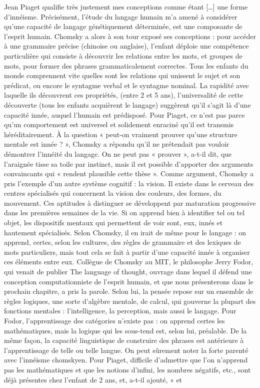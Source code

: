 Jean Piaget qualifie très justement mes conceptions comme étant […] une forme d'innéisme.
Précisément, l'étude du langage humain m'a amené à considérer qu'une capacité de langage
génétiquement déterminée, est une composante de l'esprit humain.
Chomsky a alors à son tour exposé ses conceptions : pour accéder à une grammaire précise (chinoise
ou anglaise), l'enfant déploie une compétence particulière qui consiste à découvrir les relations
entre les mots, et groupes de mots, pour former des phrases grammaticalement correctes. Tous les
enfants du monde comprennent vite quelles sont les relations qui unissent le sujet et son prédicat,
ou encore le syntagme verbal et le syntagme nominal. La rapidité avec laquelle ils découvrent
ces propriétés, (entre 2 et 5 ans), l’universalité de cette découverte (tous les enfants acquièrent le
langage) suggèrent qu'il s’agit là d’une capacité innée, auquel l'humain est prédisposé.
Pour Piaget, ce n’est pas parce qu'un comportement est universel et solidement enraciné qu'il
est transmis héréditairement. À la question « peut-on vraiment prouver qu’une structure mentale
est innée ? », Chomsky a répondu qu’il ne prétendait pas vouloir démontrer l'innéité du langage.
On ne peut pas « prouver », a-t-il dit, que l’araignée tisse sa toile par instinct, mais il est possible
d'apporter des arguments convaincants qui « rendent plausible cette thèse ». Comme argument,
Chomsky a pris l'exemple d’un autre système cognitif : la vision. Il existe dans le cerveau des
centres spécialisés qui concernent la vision des couleurs, des formes, du mouvement. Ces aptitudes
à distinguer se développent par maturation progressive dans les premières semaines de la vie. Si on
apprend bien à identifier tel ou tel objet, les dispositifs mentaux qui permettent de voir sont, eux,
innés et hautement spécialisés. Selon Chomsky, il en irait de même pour le langage : on apprend,
certes, selon les cultures, des règles de grammaire et des lexiques de mots particuliers, mais tout
cela se fait à partir d’une capacité innée à organiser ces éléments entre eux.
Collègue de Chomsky au MIT, le philosophe Jerry Fodor, qui venait de publier The language
of thought, ouvrage dans lequel il défend une conception computationniste de l'esprit humain, et
que nous présenterons dans le prochain chapitre, a pris la parole. Selon lui, la pensée repose sur un
ensemble de règles logiques, une sorte d'algèbre mentale, de calcul, qui gouverne la plupart des
fonctions mentales : l'intelligence, la perception, mais aussi le langage. Pour Fodor, l'apprentissage
des catégories n'existe pas : on apprend certes les mathématiques, mais la logique qui les sous-tend
est, selon lui, préalable. De la même façon, la capacité linguistique de construire des phrases est
antérieure à l'apprentissage de telle ou telle langue. On peut sûrement noter la forte parenté avec
l’innéisme chomskyen.
Pour Piaget, difficile d'admettre que l'on n'apprend pas les mathématiques et que les notions
d'infini, les nombres négatifs, etc., sont déjà présentes chez l'enfant de 2 ans, et, a-t-il ajouté, « et

